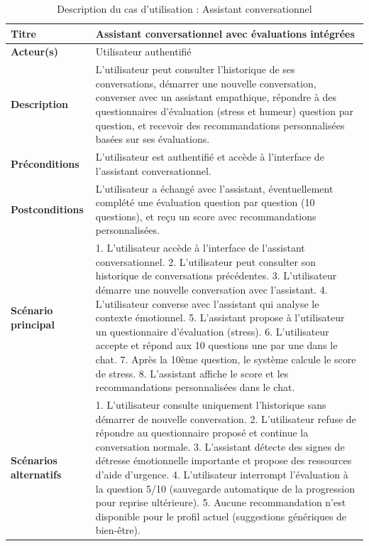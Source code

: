 \begin{table}[H]\centering
\small
\renewcommand{\arraystretch}{1.2}
\begin{tabularx}{\linewidth}{|p{3cm}|X|}
\hline
\textbf{Titre} & Assistant conversationnel avec évaluations intégrées \\
\hline
\textbf{Acteur(s)} & Utilisateur authentifié \\
\hline
\textbf{Description} & L'utilisateur peut consulter l'historique de ses conversations, démarrer une nouvelle conversation, converser avec un assistant empathique, répondre à des questionnaires d'évaluation (stress et humeur) question par question, et recevoir des recommandations personnalisées basées sur ses évaluations. \\
\hline
\textbf{Préconditions} & L'utilisateur est authentifié et accède à l'interface de l'assistant conversationnel. \\
\hline
\textbf{Postconditions} & L'utilisateur a échangé avec l'assistant, éventuellement complété une évaluation question par question (10 questions), et reçu un score avec recommandations personnalisées. \\
\hline
\textbf{Scénario principal} & 
1. L'utilisateur accède à l'interface de l'assistant conversationnel.
2. L'utilisateur peut consulter son historique de conversations précédentes.
3. L'utilisateur démarre une nouvelle conversation avec l'assistant.
4. L'utilisateur converse avec l'assistant qui analyse le contexte émotionnel.
5. L'assistant propose à l'utilisateur un questionnaire d'évaluation (stress).
6. L'utilisateur accepte et répond aux 10 questions une par une dans le chat.
7. Après la 10ème question, le système calcule le score de stress.
8. L'assistant affiche le score et les recommandations personnalisées dans le chat. \\
\hline
\textbf{Scénarios alternatifs} & 
1. L'utilisateur consulte uniquement l'historique sans démarrer de nouvelle conversation.
2. L'utilisateur refuse de répondre au questionnaire proposé et continue la conversation normale.
3. L'assistant détecte des signes de détresse émotionnelle importante et propose des ressources d'aide d'urgence.
4. L'utilisateur interrompt l'évaluation à la question 5/10 (sauvegarde automatique de la progression pour reprise ultérieure).
5. Aucune recommandation n'est disponible pour le profil actuel (suggestions génériques de bien-être). \\
\hline
\end{tabularx}
\caption{Description du cas d'utilisation : Assistant conversationnel}
\end{table}

